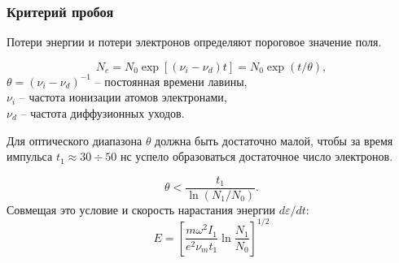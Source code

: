 \documentclass{beamer}
\begin{document}
	\begin{frame}
		\frametitle{Критерий пробоя}
		
		Потери энергии и потери электронов определяют пороговое значение поля.
		
		$$ N_e = N_0 \exp\left[(\nu_i - \nu_d) t\right] = N_0 \exp(t/\theta),$$
		$\theta = (\nu_i - \nu_d)^{-1}$ -- постоянная времени лавины,\\
		$\nu_i$ -- частота ионизации атомов электронами,\\
		$\nu_d$ -- частота диффузионных уходов.

		Для оптического диапазона $\theta$ должна быть достаточно малой, чтобы за время импульса $t_1 \approx 30 \div 50$ нс успело образоваться достаточное число электронов.
		
		$$ \theta < \frac{t_1}{\ln( N_1 / N_0)}.$$
		Совмещая это условие и скорость нарастания энергии $d\varepsilon/dt$:
		$$ E = \left[\frac{m \omega^2 I_1}{e^2 \nu_m t_1} \ln \frac{N_1} {N_0}\right]^{1/2}$$


%		
%		
%		
%		
%		
%		
%		
%		
%		
%		
%		
	\end{frame}
\end{document}
